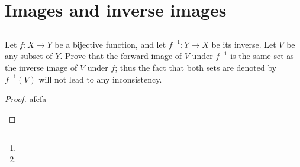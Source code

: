 \documentclass[../../main.tex]{subfiles}
\begin{document}
\ifmainfile
\else
    \maketitle
    \addtocounter{chapter}{3}
    \addtocounter{section}{3}
    \section{Images and inverse images}
\fi

\subsection{}
\begin{q}
    Let $f \colon X \to Y$ be a bijective function, and let $f^{-1} \colon Y \to X$ be its inverse. Let $V$ be any subset of $Y$. Prove that the forward image of $V$ under $f^{-1}$ is the same set as the inverse image of $V$ under $f$; thus the fact that both sets are denoted by $f^{-1}(V)$ will not lead to any inconsistency.
\end{q}

\begin{ans}
    
\end{ans}
    
\begin{proof}
    afefa
    \begin{xx}
        
    \end{xx}
\end{proof}

\subsection{}
\begin{q}
    
\end{q}
\begin{enumerate}
    \item
        
    \item
        
\end{enumerate}
\end{document}
